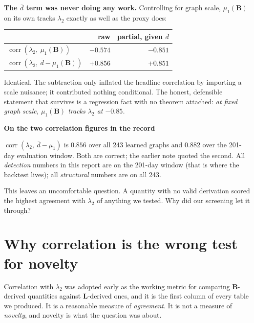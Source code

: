 \documentclass[11pt,a4paper]{article}
\newcommand{\Lap}{\mathbf{L}}
\newcommand{\Bmat}{\mathbf{B}}
\newenvironment{aside}[1]
 {\par\vspace{2.5mm}\begin{lrbox}{\asidebox}%
  \begin{minipage}{\dimexpr\textwidth-16pt\relax}\small\textbf{#1}\par\vspace{1mm}}
 {\end{minipage}\end{lrbox}%
  \noindent\setlength{\fboxsep}{7pt}\setlength{\fboxrule}{.4pt}%
  \fcolorbox{Rule}{Panel2}{\usebox{\asidebox}}\par\vspace{2.5mm}}
\begin{document}
\textbf{The $\bar d$ term was never doing any work.} Controlling for graph scale,
$\mu_1(\Bmat)$ on its own tracks $\lambda_2$ exactly as well as the proxy does:

\begin{center}\small
\begin{tabular}{@{}lrr@{}}
\toprule
& \textbf{raw} & \textbf{partial, given $\bar d$} \\
\midrule
$\operatorname{corr}(\lambda_2,\ \mu_1(\Bmat))$ & $-0.574$ & $\mathbf{-0.851}$ \\
$\operatorname{corr}(\lambda_2,\ \bar d-\mu_1(\Bmat))$ & $+0.856$ & $\mathbf{+0.851}$ \\
\bottomrule
\end{tabular}
\end{center}

Identical. The subtraction only inflated the headline correlation by importing a
scale nuisance; it contributed nothing conditional. The honest, defensible
statement that survives is a regression fact with no theorem attached: \emph{at
fixed graph scale, $\mu_1(\Bmat)$ tracks $\lambda_2$ at $-0.85$.}

\begin{aside}{On the two correlation figures in the record}
$\operatorname{corr}(\lambda_2,\ \bar d-\mu_1)$ is $0.856$ over all 243 learned
graphs and $0.882$ over the 201-day evaluation window. Both are correct; the
earlier note quoted the second. All \emph{detection} numbers in this report are on
the 201-day window (that is where the backtest lives); all \emph{structural}
numbers are on all 243.
\end{aside}

This leaves an uncomfortable question. A quantity with no valid derivation scored
the highest agreement with $\lambda_2$ of anything we tested. Why did our
screening let it through?

\section{Why correlation is the wrong test for novelty}

Correlation with $\lambda_2$ was adopted early as the working metric for comparing
$\Bmat$-derived quantities against $\Lap$-derived ones, and it is the first column
of every table we produced. It is a reasonable measure of \emph{agreement}. It is
not a measure of \emph{novelty}, and novelty is what the question was about.
\end{document}
